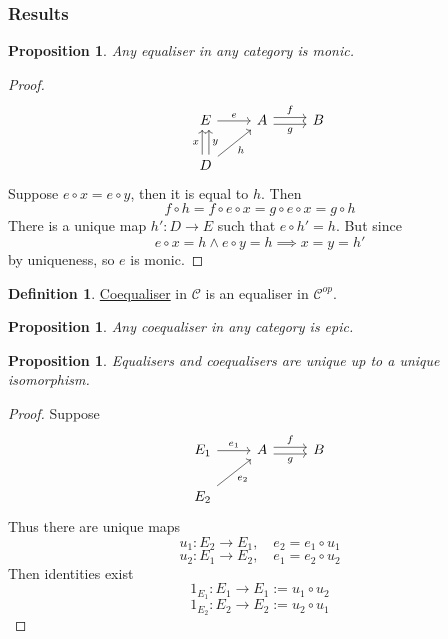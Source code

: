 \documentclass[11pt]{article} %
\newtheorem{proposition}[theorem]{Proposition}
\theoremstyle{definition}
\newtheorem{definition}[theorem]{Definition}
\theoremstyle{definition}
\theoremstyle{definition}
\begin{document}
\subsubsection{Results}
\begin{proposition}
    Any equaliser in any category is monic.
\end{proposition}
\begin{proof}
\[\begin{tikzcd}
	E & A & B \\
	D
	\arrow["f", shift left, from=1-2, to=1-3]
	\arrow["g"', shift right, from=1-2, to=1-3]
	\arrow["e", from=1-1, to=1-2]
	\arrow["h"', from=2-1, to=1-2]
	\arrow["x", shift left, from=2-1, to=1-1]
	\arrow["y"', shift right, from=2-1, to=1-1]
\end{tikzcd}\]
Suppose $e \circ x = e\circ y$, then it is equal to $h$. Then
\[f\circ h = f\circ e\circ x = g\circ e\circ x = g\circ h\]
There is a unique map $h' :D\rightarrow E$ such that $e\circ h' = h$.
But since
\[e\circ x = h \wedge e\circ y = h \implies x = y = h'\]
by uniqueness, so $e$ is monic.
\end{proof}

\begin{definition}
    \underline{Coequaliser} in $\mathcal{C}$ is an equaliser in $\mathcal{C}^{op}$.
\end{definition}
\begin{proposition}
    Any coequaliser in any category is epic.
\end{proposition}

\begin{proposition}
    Equalisers and coequalisers are unique up to a unique isomorphism.
\end{proposition}
\begin{proof}
Suppose
\[\begin{tikzcd}
	{E_1} & A & B \\
	{E_2}
	\arrow["f", shift left, from=1-2, to=1-3]
	\arrow["g"', shift right, from=1-2, to=1-3]
	\arrow["{e_1}", from=1-1, to=1-2]
	\arrow["{e_2}"', from=2-1, to=1-2]
\end{tikzcd}\]
Thus there are unique maps
\[u_1: E_2 \rightarrow E_1, \quad e_2 = e_1 \circ u_1\]
\[u_2: E_1 \rightarrow E_2, \quad e_1 = e_2 \circ u_2\]
Then identities exist
\[1_{E_1}: E_1 \rightarrow E_1 := u_1 \circ u_2\]
\[1_{E_2}: E_2 \rightarrow E_2 := u_2 \circ u_1\]
\end{proof}
\end{document}
